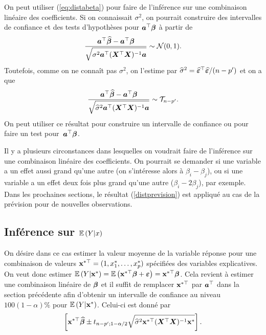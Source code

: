 On peut utiliser (\ref{eq:distabeta}) pour faire de l'inférence sur une combinaison linéaire des coefficients.
Si on connaissait $\sigma^2$, on pourrait construire des intervalles de confiance et des tests d'hypothèses pour ${\bm{a}}^\top\bm\beta$ à partir de
\begin{eqnarray}
	\frac{{\bm{a}}^\top\widehat{\bm\beta}-{\bm{a}}^\top\bm\beta}{\displaystyle\sqrt{\sigma^2{\bm{a}}^\top(\bm{X}^\top\bm{X})^{-1}{\bm{a}}}} \sim \mathcal{N}(0,1).
\end{eqnarray}
Toutefois, comme on ne connaît pas $\sigma^2$, on l'estime par $\widehat{\sigma}^2=\widehat{\bm\varepsilon}^\top\widehat{\bm\varepsilon} / (n-p')$  et on a que
\begin{eqnarray}
		\frac{{\bm{a}}^\top\widehat{\bm\beta}-{\bm{a}}^\top\bm\beta}{\displaystyle\sqrt{\widehat{\sigma}^2{\bm{a}}^\top(\bm{X}^\top\bm{X})^{-1}{\bm{a}}}} \sim \mathcal{T}_{n-p'}.
		\label{distprevision}
\end{eqnarray}
On peut  utiliser ce résultat pour construire un intervalle de confiance ou pour faire un test pour~${\bm{a}}^\top\bm\beta$.

\begin{remarque}
Il y a plusieurs circonstances dans lesquelles on voudrait faire de l'inférence sur une combinaison linéaire des coefficients. On pourrait se demander si une variable a un effet aussi grand qu'une autre (on s'intéresse alors à $\beta_i - \beta_j$), ou si une variable a un effet deux fois plus grand qu'une autre ($\beta_i - 2\beta_j$), par exemple. Dans les prochaines sections, le résultat (\ref{distprevision}) est appliqué au cas de la prévision pour de nouvelles observations.
\end{remarque}


\subsection{Inférence sur $\mathbb{E}\left(Y|x\right)$}
\label{sec:previsionRLM1}

On désire dans ce cas estimer la valeur moyenne de la variable réponse pour une combinaison de valeurs $\bold{x}^{*\top}=(1, x_1^*,\ldots,x_{p}^*)$ spécifiées des variables explicatives. On veut donc estimer
$\mathbb{E}\left(Y|\bold{x}^*\right)=\mathbb{E}\left(\bold{x}^{*\top}\bm\beta+\bm{\varepsilon}\right)=\bold{x}^{*\top}\bm\beta$.
Cela revient à estimer une combinaison linéaire de $\bm\beta$ et il suffit de  remplacer $\bold{x}^{*\top}$ par ${\bm{a}}^\top$ dans la section précédente afin d'obtenir un intervalle de confiance au niveau $100(1-\alpha)\%$ pour $\mathbb{E}\left(Y|\bold{x}^*\right)$.
Celui-ci est donné par
\begin{equation}\label{ci:EY}
\left[\displaystyle\bold{x}^{*\top}\widehat{\bm\beta}\pm
t_{n-p'; 1-\alpha/2}\sqrt{\widehat{\sigma}^2\bold{x}^{*\top}(\bm{X}^\top\bm{X})^{-1}\bold{x}^*}\right].
\end{equation}

